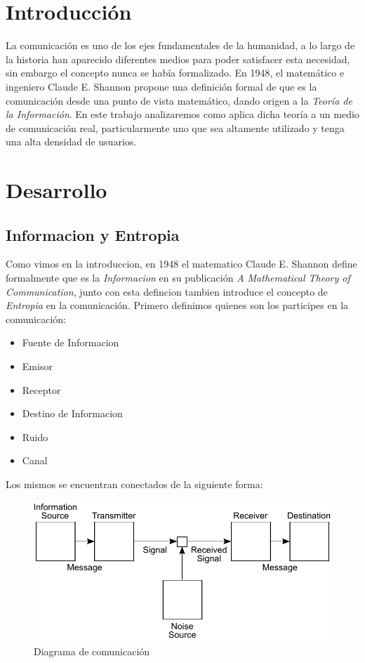 \section{Introducción}

La comunicación es uno de los ejes fundamentales de la humanidad, a lo largo de la historia han aparecido diferentes medios para poder satisfacer esta necesidad, sin embargo el concepto nunca se había formalizado. En 1948, el matemático e ingeniero Claude E. Shannon propone una definición formal de que es la comunicación desde una punto de vista matemático, dando origen a la \textit{Teoría de la Información}. En este trabajo analizaremos como aplica dicha teoría a un medio de comunicación real, particularmente uno que sea altamente utilizado y tenga una alta densidad de usuarios.

\section{Desarrollo}

\subsection{Informacion y Entropia}

Como vimos en la introduccion, en 1948 el matematico Claude E. Shannon define formalmente que es la \textit{Informacion} en su publicación \textit{A Mathematical Theory of Communication}, junto con esta defincion tambien introduce el concepto de \textit{Entropia} en la comunicación. Primero definimos quienes son los participes en la comunicación:

\begin{itemize}
	\item Fuente de Informacion
	\item Emisor
	\item Receptor
	\item Destino de Informacion
	\item Ruido
	\item Canal
\end{itemize}

Los mismos se encuentran conectados de la siguiente forma:

\begin{figure}[ht]
\begin{center}
\includegraphics[width=0.6\columnwidth]{graficos/Shannon.pdf}
\caption{Diagrama de comunicación}
\end{center}
\end{figure}

